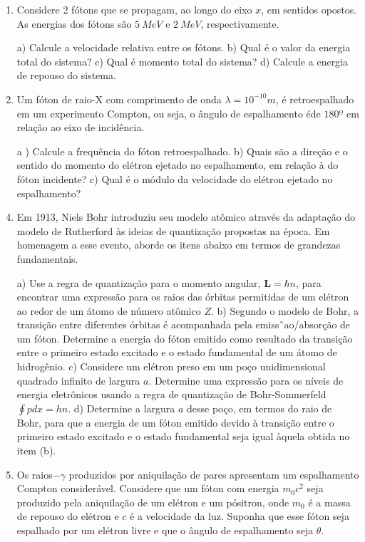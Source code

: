 \begin{enumerate}[start=1,label={\bfseries Q\arabic*.}]
\item Considere 2 fótons que se propagam, ao longo do eixo $x$, em sentidos opostos. As energias dos fótons são $5 \ MeV$ e $2 \ MeV$, respectivamente.

a) Calcule a velocidade relativa entre os fótons.
b) Qual é o valor da energia total do sistema?
c) Qual é momento total do sistema?
d) Calcule a energia de repouso do sistema.


\item Um fóton de raio-X com comprimento de onda $ \lambda = 10^{-10} m$, é retroespalhado em um experimento Compton, ou seja, o ângulo de espalhamento éde $180º$ em relação ao eixo de incidência.


\item[a )] Calcule a frequência do fóton retroespalhado.
b) Quais são a direção e o sentido do momento do elétron ejetado no espalhamento, em relação à do fóton incidente?
c) Qual é o módulo da velocidade do elétron ejetado no espalhamento?





\item Em 1913, Niels Bohr introduziu seu modelo atômico através da adaptação do modelo de Rutherford às ideias de quantização propostas na época. Em homenagem a esse evento, aborde os itens abaixo em termos de grandezas fundamentais.


a) Use a regra de quantização para o momento angular, $\mathbf{L} = \hbar n$, para encontrar uma expressão para os raios das órbitas permitidas de um elétron ao redor de um átomo de número atômico $Z$.
b) Segundo o modelo de Bohr, a transição entre diferentes órbitas é acompanhada pela emiss˜ao/absorção de um fóton. Determine a energia do fóton emitido como resultado da transição entre o primeiro estado excitado e o estado fundamental de um átomo de hidrogênio.
c) Considere um elétron preso em um poço unidimensional quadrado infinito de largura $a$. Determine uma expressão para os níveis de energia eletrônicos usando a regra de quantização de Bohr-Sommerfeld $\oint p dx = hn$.
d) Determine a largura $a$ desse poço, em termos do raio de Bohr, para que a energia de um fóton emitido devido à transição entre o primeiro estado excitado e o estado fundamental seja igual àquela obtida no item (b).




\item Os raios$-\gamma$ produzidos por aniquilação de pares apresentam um espalhamento Compton considerável. Considere que um fóton com energia $m_{0}c^{2}$ seja produzido pela aniquilação de um elétron e um pósitron, onde $m_{0}$ é a massa de repouso do elétron e $c$ é a velocidade da luz. Suponha que esse fóton seja espalhado por um elétron livre e que o ângulo de espalhamento seja $\theta$.



\end{enumerate}
